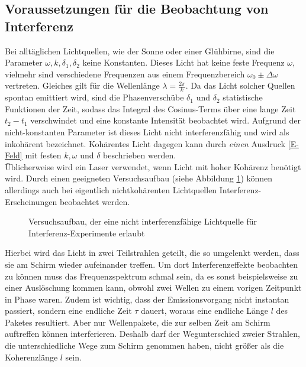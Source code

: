 \subsection*{Voraussetzungen für die Beobachtung von Interferenz}
Bei alltäglichen Lichtquellen, wie der Sonne oder einer Glühbirne, sind die Parameter $\omega,k,\delta_1,\delta_2$ keine Konstanten. Dieses Licht hat keine feste Frequenz $\omega$, vielmehr sind verschiedene Frequenzen aus einem Frequenzbereich $\omega_0\pm\Delta \omega$ vertreten. Gleiches gilt für die Wellenlänge $\lambda=\frac{2\pi}{k}$. Da das Licht solcher Quellen spontan emittiert wird, sind die Phasenverschübe $\delta_1$ und $\delta_2$ statistische Funktionen der Zeit, sodass das Integral des Cosinus-Terms über eine lange Zeit $t_2-t_1$ verschwindet und eine konstante Intensität beobachtet wird. Aufgrund der nicht-konstanten Parameter ist dieses Licht nicht interferenzfähig und wird als inkohärent bezeichnet. Kohärentes Licht dagegen kann durch \emph{einen} Ausdruck \eqref{E-Feld} mit festen $k, \omega$ und $\delta$ beschrieben werden. \\
Üblicherweise wird ein Laser verwendet, wenn Licht mit hoher Kohärenz benötigt wird. Durch einen geeigneten Versuchsaufbau (siehe Abbildung \ref{Gluhlampe}) können allerdings auch bei eigentlich nichtkohärenten Lichtquellen Interferenz-Erscheinungen beobachtet werden.
\begin{figure}[h!]
	\centering
	
	\caption{Versuchsaufbau, der eine nicht interferenzfähige Lichtquelle für Interferenz-Experimente erlaubt}
	\label{Gluhlampe}
\end{figure} 
Hierbei wird das Licht in zwei Teilstrahlen geteilt, die so umgelenkt werden, dass sie am Schirm wieder aufeinander treffen. Um dort Interferenzeffekte beobachten zu können muss das Frequenzspektrum schmal sein, da es sonst beispielsweise zu einer Auslöschung kommen kann, obwohl zwei Wellen zu einem vorigen Zeitpunkt in Phase waren. Zudem ist wichtig, dass der Emissionsvorgang nicht instantan passiert, sondern eine endliche Zeit $\tau$ dauert, woraus eine endliche Länge $l$ des Paketes resultiert. Aber nur Wellenpakete, die zur selben Zeit am Schirm auftreffen können interferieren. Deshalb darf der Wegunterschied zweier Strahlen, die unterschiedliche Wege zum Schirm genommen haben, nicht größer als die Koherenzlänge $l$ sein.